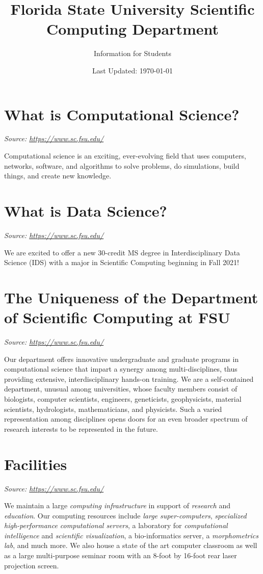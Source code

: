 \documentclass[12pt,a4paper]{article}
\title{Florida State University Scientific Computing Department}
\author{Information for Students}
\date{Last Updated: \today}
\begin{document}
\maketitle
\newpage
\onehalfspacing


\section{What is Computational Science?}
\textit{Source: \url{https://www.sc.fsu.edu/}}

Computational science is an exciting, ever-evolving field that uses computers, networks, software, and algorithms to solve problems, do simulations, build things, and create new knowledge.

\section{What is Data Science?}
\textit{Source: \url{https://www.sc.fsu.edu/}}

We are excited to offer a new 30-credit MS degree in Interdisciplinary Data Science (IDS) with a major in Scientific Computing beginning in Fall 2021!

\section{The Uniqueness of the Department of Scientific Computing at FSU}
\textit{Source: \url{https://www.sc.fsu.edu/}}

Our department offers innovative undergraduate and graduate programs in computational science that impart a synergy among multi-disciplines, thus providing extensive, interdisciplinary hands-on training. We are a self-contained department, unusual among universities, whose faculty members consist of biologists, computer scientists, engineers, geneticists, geophysicists, material scientists, hydrologists, mathematicians, and physicists. Such a varied representation among disciplines opens doors for an even broader spectrum of research interests to be represented in the future.

\section{Facilities}
\textit{Source: \url{https://www.sc.fsu.edu/}}

We maintain a large \textit{computing infrastructure} in support of \textit{research} and \textit{education}. Our computing resources include \textit{large super-computers}, \textit{specialized high-performance computational servers}, a laboratory for \textit{computational intelligence} and \textit{scientific visualization}, a bio-informatics server, a \textit{morphometrics lab}, and much more. We also house a state of the art computer classroom as well as a large multi-purpose seminar room with an 8-foot by 16-foot rear laser projection screen.
\end{document}
